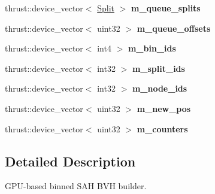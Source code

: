 \begin{DoxyCompactItemize}
\item 
\hypertarget{structnih_1_1cuda_1_1_binned__sah__builder_a7e9b9e16f2802e106fdcb12c9dbdb031}{
thrust\-::device\-\_\-vector$<$ \hyperlink{structnih_1_1cuda_1_1binned__sah_1_1_split}{\-Split} $>$ {\bfseries m\-\_\-queue\-\_\-splits}}
\label{structnih_1_1cuda_1_1_binned__sah__builder_a7e9b9e16f2802e106fdcb12c9dbdb031}

\item 
\hypertarget{structnih_1_1cuda_1_1_binned__sah__builder_a276eeb44bed867172c818c4f256c9b12}{
thrust\-::device\-\_\-vector$<$ uint32 $>$ {\bfseries m\-\_\-queue\-\_\-offsets}}
\label{structnih_1_1cuda_1_1_binned__sah__builder_a276eeb44bed867172c818c4f256c9b12}

\item 
\hypertarget{structnih_1_1cuda_1_1_binned__sah__builder_a949b3b856a6e0fb81b5be169768e3b68}{
thrust\-::device\-\_\-vector$<$ int4 $>$ {\bfseries m\-\_\-bin\-\_\-ids}}
\label{structnih_1_1cuda_1_1_binned__sah__builder_a949b3b856a6e0fb81b5be169768e3b68}

\item 
\hypertarget{structnih_1_1cuda_1_1_binned__sah__builder_aa6475cf583a04104307b4fb62d13c738}{
thrust\-::device\-\_\-vector$<$ int32 $>$ {\bfseries m\-\_\-split\-\_\-ids}}
\label{structnih_1_1cuda_1_1_binned__sah__builder_aa6475cf583a04104307b4fb62d13c738}

\item 
\hypertarget{structnih_1_1cuda_1_1_binned__sah__builder_a0ee10cc2841c1cce7250db6c3d25f4d7}{
thrust\-::device\-\_\-vector$<$ int32 $>$ {\bfseries m\-\_\-node\-\_\-ids}}
\label{structnih_1_1cuda_1_1_binned__sah__builder_a0ee10cc2841c1cce7250db6c3d25f4d7}

\item 
\hypertarget{structnih_1_1cuda_1_1_binned__sah__builder_a64720f7846a23e8b928bf893a7c7542d}{
thrust\-::device\-\_\-vector$<$ uint32 $>$ {\bfseries m\-\_\-new\-\_\-pos}}
\label{structnih_1_1cuda_1_1_binned__sah__builder_a64720f7846a23e8b928bf893a7c7542d}

\item 
\hypertarget{structnih_1_1cuda_1_1_binned__sah__builder_accf758923f191a318793f5f46d0895d2}{
thrust\-::device\-\_\-vector$<$ uint32 $>$ {\bfseries m\-\_\-counters}}
\label{structnih_1_1cuda_1_1_binned__sah__builder_accf758923f191a318793f5f46d0895d2}

\end{DoxyCompactItemize}


\subsection{\-Detailed \-Description}
\-G\-P\-U-\/based binned \-S\-A\-H \-B\-V\-H builder.

